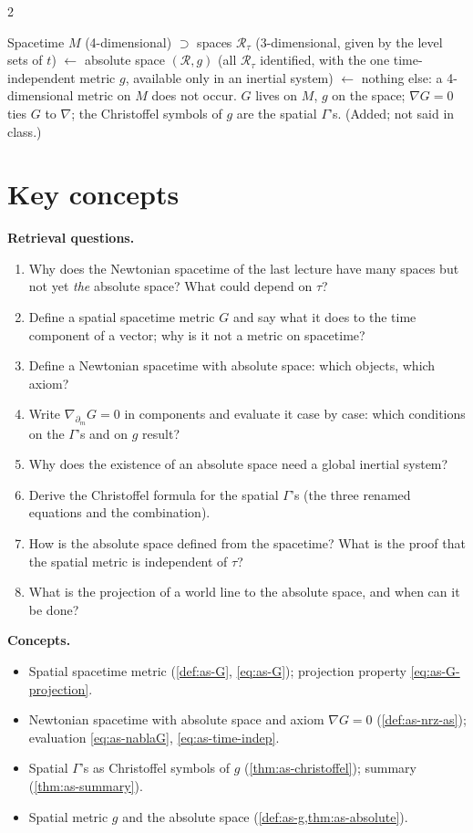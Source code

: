 \begin{paracol}{2}
\begin{coursenote}
Spacetime $M$ (4-dimensional) $\supset$ spaces $\mathcal R_\tau$ (3-dimensional, given by the level sets of $t$) $\leftarrow$ absolute space $(\mathcal R,g)$ (all $\mathcal R_\tau$ identified, with the one time-independent metric $g$, available only in an inertial system) $\leftarrow$ nothing else: a 4-dimensional metric on $M$ does not occur.
$G$ lives on $M$, $g$ on the space; $\nabla G=0$ ties $G$ to $\nabla$; the Christoffel symbols of $g$ are the spatial $\Gamma$'s. (Added; not said in class.)
\end{coursenote}

\section*{Key concepts}
\begin{keyconcepts}
\textbf{Retrieval questions.}
\begin{enumerate}
  \item Why does the Newtonian spacetime of the last lecture have many spaces but not yet \emph{the} absolute space? What could depend on $\tau$?
  \item Define a spatial spacetime metric $G$ and say what it does to the time component of a vector; why is it not a metric on spacetime?
  \item Define a Newtonian spacetime with absolute space: which objects, which axiom?
  \item Write $\nabla_{\partial_m}G=0$ in components and evaluate it case by case: which conditions on the $\Gamma$'s and on $g$ result?
  \item Why does the existence of an absolute space need a global inertial system?
  \item Derive the Christoffel formula for the spatial $\Gamma$'s (the three renamed equations and the combination).
  \item How is the absolute space defined from the spacetime? What is the proof that the spatial metric is independent of $\tau$?
  \item What is the projection of a world line to the absolute space, and when can it be done?
\end{enumerate}
\textbf{Concepts.}
\begin{itemize}
  \item Spatial spacetime metric (\cref{def:as-G}, \eqref{eq:as-G}); projection property \eqref{eq:as-G-projection}.
  \item Newtonian spacetime with absolute space and axiom $\nabla G=0$ (\cref{def:as-nrz-as}); evaluation \eqref{eq:as-nablaG}, \eqref{eq:as-time-indep}.
  \item Spatial $\Gamma$'s as Christoffel symbols of $g$ (\cref{thm:as-christoffel}); summary (\cref{thm:as-summary}).
  \item Spatial metric $g$ and the absolute space (\cref{def:as-g,thm:as-absolute}).
\end{itemize}
\end{keyconcepts}

\flushside
\end{paracol}
